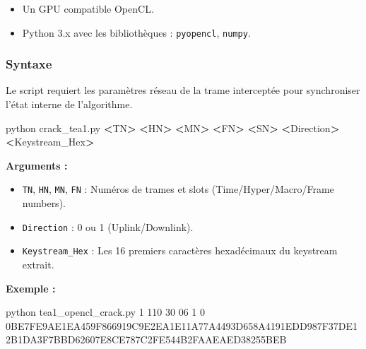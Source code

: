 \documentclass[
  french,
]{article}
\newenvironment{Shaded}{\begin{snugshade}}{\end{snugshade}}
\newcommand{\ExtensionTok}[1]{#1}
\newcommand{\NormalTok}[1]{#1}
\newcommand{\OperatorTok}[1]{\textcolor[rgb]{0.81,0.36,0.00}{\textbf{#1}}}
\providecommand{\tightlist}{%
  \setlength{\itemsep}{0pt}\setlength{\parskip}{0pt}}
\begin{document}
\begin{itemize}
\tightlist
\item
  Un GPU compatible OpenCL.
\item
  Python 3.x avec les bibliothèques : \texttt{pyopencl}, \texttt{numpy}.
\end{itemize}

\subsubsection{Syntaxe}\label{syntaxe}

Le script requiert les paramètres réseau de la trame interceptée pour
synchroniser l'état interne de l'algorithme.

\begin{Shaded}
\begin{Highlighting}[]
\ExtensionTok{python}\NormalTok{ crack\_tea1.py }\OperatorTok{\textless{}}\NormalTok{TN}\OperatorTok{\textgreater{}} \OperatorTok{\textless{}}\NormalTok{HN}\OperatorTok{\textgreater{}} \OperatorTok{\textless{}}\NormalTok{MN}\OperatorTok{\textgreater{}} \OperatorTok{\textless{}}\NormalTok{FN}\OperatorTok{\textgreater{}} \OperatorTok{\textless{}}\NormalTok{SN}\OperatorTok{\textgreater{}} \OperatorTok{\textless{}}\NormalTok{Direction}\OperatorTok{\textgreater{}} \OperatorTok{\textless{}}\NormalTok{Keystream\_Hex}\OperatorTok{\textgreater{}}
\end{Highlighting}
\end{Shaded}

\textbf{Arguments :}

\begin{itemize}
\tightlist
\item
  \texttt{TN}, \texttt{HN}, \texttt{MN}, \texttt{FN} : Numéros de trames
  et slots (Time/Hyper/Macro/Frame numbers).
\item
  \texttt{Direction} : 0 ou 1 (Uplink/Downlink).
\item
  \texttt{Keystream\_Hex} : Les 16 premiers caractères hexadécimaux du
  keystream extrait.
\end{itemize}

\textbf{Exemple :}

\begin{Shaded}
\begin{Highlighting}[]
\ExtensionTok{python}\NormalTok{ tea1\_opencl\_crack.py 1 110 30 06 1 0 0BE7FE9AE1EA459F866919C9E2EA1E11A77A4493D658A4191EDD987F37DE12B1DA3F7BBD62607E8CE787C2FE544B2FAAEAED38255BEB}
\end{Highlighting}
\end{Shaded}
\end{document}
